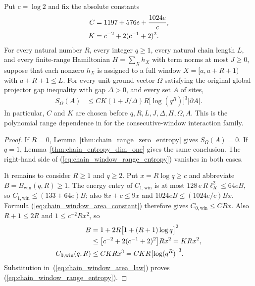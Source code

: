 \begin{corollary}
    \label{thm:chain_window_polynomial_range}
    \leanok
    Put $c=\log2$ and fix the absolute constants
    \begin{align}
        C & =1197+576e+\frac{1024e}{c},\notag \\
        K & =c^{-2}+2(c^{-1}+2)^2.\notag
    \end{align}
    For every natural number $R$, every integer $q\ge1$, every natural
    chain length $L$, and every finite-range Hamiltonian $H=\sum_X h_X$
    with term norms at most $J\ge0$, suppose that each nonzero $h_X$ is
    assigned to a full window $X=[a,a+R+1)$ with $a+R+1\le L$.
    For every unit ground vector $\Omega$ satisfying the original global
    projector gap inequality with gap $\Delta>0$, and every set $A$ of
    sites,
    \begin{align}
        S_\Omega(A)
         & \le CK(1+J/\Delta)R\bigl[\log(q^R)\bigr]^3|\partial A|.
        \label{eq:chain_window_range_entropy}
    \end{align}
    In particular, $C$ and $K$ are chosen before $q,R,L,J,\Delta,H,\Omega,A$.
    This is the polynomial range dependence in
    \cite[Part~I, Remark~6.3]{TNLean2026OneDimensional} for the
    consecutive-window interaction family.
\end{corollary}
\begin{proof}
    \leanok
    If $R=0$, Lemma~\ref{thm:chain_range_zero_entropy} gives
    $S_\Omega(A)=0$.
    If $q=1$, Lemma~\ref{thm:chain_entropy_dim_one} gives the same
    conclusion. The right-hand side of
    (\ref{eq:chain_window_range_entropy}) vanishes in both cases.

    It remains to consider $R\ge1$ and $q\ge2$. Put $x=R\log q\ge c$
    and abbreviate $B=B_{\mathrm{win}}(q,R)\ge1$.
    The energy entry of $C_{1,\mathrm{win}}$ is at most
    $128\,e\,R\ell_R^2\le64eB$, so $C_{1,\mathrm{win}}\le(133+64e)B$; also
    $8x+c\le9x$ and $1024eB\le(1024e/c)Bx$. Formula
    (\ref{eq:chain_window_area_constant}) therefore gives
    $C_{0,\mathrm{win}}\le CBx$. Also $R+1\le2R$ and
    $1\le c^{-2}Rx^2$, so
    \begin{align}
        B
         & =1+2R\bigl[1+(R+1)\log q\bigr]^2\notag       \\
         & \le\bigl[c^{-2}+2(c^{-1}+2)^2\bigr]Rx^2
        =KRx^2,\notag                                   \\
        C_{0,\mathrm{win}}(q,R)
         & \le CKRx^3=CKR\bigl[\log(q^R)\bigr]^3.\notag
    \end{align}
    Substitution in~(\ref{eq:chain_window_area_law}) proves
    (\ref{eq:chain_window_range_entropy}).
\end{proof}


